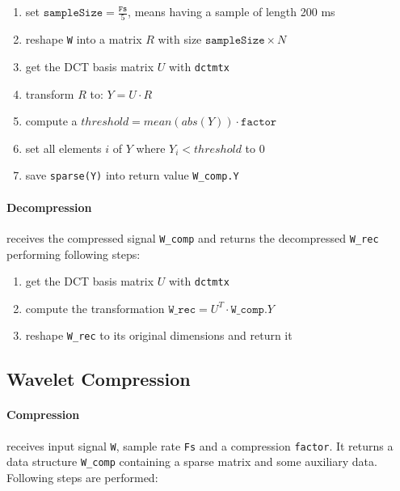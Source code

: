 \documentclass[a4paper]{scrartcl}
\begin{document}
\begin{enumerate}

\item set $\texttt{sampleSize} = \frac{\texttt{Fs}}{5}$, means having a sample of
length 200 ms

\item reshape \texttt{W} into a matrix $R$ with size $\texttt{sampleSize} \times
N$

\item get the DCT basis matrix $U$ with \texttt{dctmtx}

\item transform $R$ to: $Y = U \cdot R$

\item compute a $threshold = mean(abs(Y)) \cdot \texttt{factor}$

\item set all elements $i$ of $Y$ where $Y_i < threshold$ to $0$

\item save \texttt{sparse(Y)} into return value \texttt{W\_comp.Y}


\end{enumerate}


\paragraph{Decompression} receives the compressed signal \texttt{W\_comp} and
returns the decompressed \texttt{W\_rec} performing following steps:

\begin{enumerate}

\item get the DCT basis matrix $U$ with \texttt{dctmtx}

\item compute the transformation $\texttt{W\_rec} = U^T \cdot
\texttt{W\_comp}.Y$

\item reshape \texttt{W\_rec} to its original dimensions and return it

\end{enumerate}

\subsection{Wavelet Compression}
\label{sec:waveletCompression}

\paragraph{Compression} receives input signal \texttt{W}, sample rate
\texttt{Fs} and a compression \texttt{factor}. It returns a data structure
\texttt{W\_comp} containing a sparse matrix and some auxiliary data. Following
steps are performed:
\end{document}

